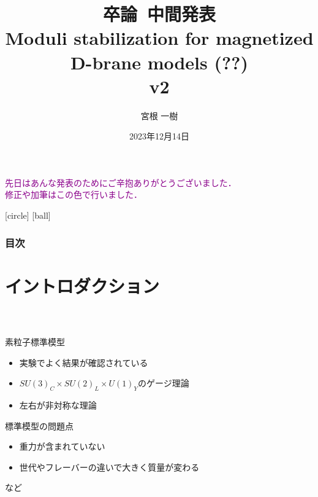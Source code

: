 \documentclass[
  a4paper,uplatex,dvipdfmx,10pt,
  xcolor = {dvipsnames,svgnames},
  hyperref ={colorlinks=true,citecolor=Navy,linkcolor=NavyBlue,urlcolor=purple}
]{beamer}
\title{
  卒論\ 中間発表
  \\
  {\Large Moduli stabilization for magnetized D-brane models (??)}
  \\
  v2
}
\author{宮根 一樹}
\date{2023年12月14日}
\begin{document}
\begin{frame}
  \titlepage
  \begin{center}
    \textcolor{DarkMagenta}{
      先日はあんな発表のためにご辛抱ありがとうございました．
      \\
      修正や加筆はこの色で行いました．
    }
  \end{center}
\end{frame}

[circle]
[ball]
\begin{frame}[allowframebreaks]
  \frametitle{目次}
  \tableofcontents
\end{frame}


\section{イントロダクション}

\begin{frame}
  \frametitle{\thesection\ \secname}
  \color{DarkMagenta}

  素粒子標準模型
  \begin{itemize}
    \color{DarkMagenta}
    \item 
    実験でよく結果が確認されている
    \item 
    $SU(3)_{C}\times SU(2)_{L}\times U(1)_{Y}$のゲージ理論
    \item 
    左右が非対称な理論
  \end{itemize}

  \vspace{10pt}

  標準模型の問題点
  \begin{itemize}
    \color{DarkMagenta}
    \item 
    重力が含まれていない
    \item 
    世代やフレーバーの違いで大きく質量が変わる
  \end{itemize}
  {\hspace{8cm} など}

\end{frame}
\end{document}
